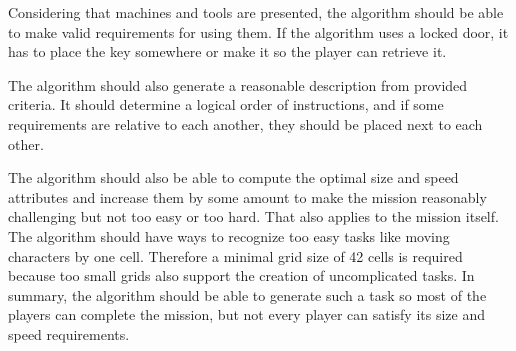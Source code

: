 Considering that machines and tools are presented,
the algorithm should be able to make valid requirements for using them.
If the algorithm uses a locked door, it has to place the key somewhere or make it so the player can retrieve it.

The algorithm should also generate a reasonable description from provided criteria.
It should determine a logical order of instructions, and if some requirements are relative to each another, they should be placed next to each other.

The algorithm should also be able to compute the optimal size and speed attributes and increase them by some amount to make the mission reasonably challenging but not too easy or too hard.
That also applies to the mission itself.
The algorithm should have ways to recognize too easy tasks like moving characters by one cell.
Therefore a minimal grid size of 42 cells is required because too small grids also support the creation of uncomplicated tasks.
In summary, the algorithm should be able to generate such a task so most of the players can complete the mission, but not every player can satisfy its size and speed requirements.
